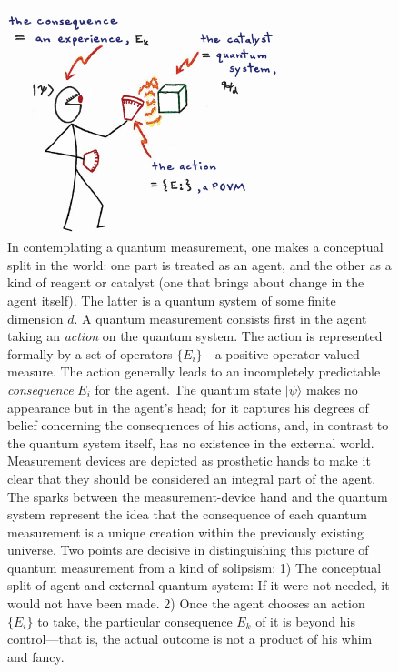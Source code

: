 \begin{figure}
\begin{center}
\includegraphics[height=2.6in]{paulianidea-n3.eps}
\bigskip\caption{\small In contemplating a quantum measurement, one makes a conceptual split in the world:  one part is treated as an agent, and the other as a kind of reagent or catalyst (one that brings about change in the agent itself).  The latter is a quantum system of some finite dimension $d$.  A quantum measurement consists first in the agent taking an {\it action\/} on the quantum system.  The action is represented formally by a set of operators $\{E_i\}$---a positive-operator-valued measure. The action generally leads to an incompletely predictable {\it consequence\/} $E_i$ for the agent.  The quantum state $|\psi\rangle$ makes no appearance but in the agent's head; for it captures his degrees of belief concerning the consequences of his actions, and, in contrast to the quantum system itself, has no existence in the external world.  Measurement devices are depicted as prosthetic hands to make it clear that they should be considered an integral part of the agent.  The sparks between the measurement-device hand and the quantum system represent the idea that the consequence of each quantum measurement is a unique creation within the previously existing universe.  Two points are decisive in distinguishing this picture of quantum measurement from a kind of solipsism:  1) The conceptual split of agent and external quantum system: If it were not needed, it would not have been made. 2) Once the agent chooses an action $\{E_i\}$ to take, the particular consequence $E_k$ of it is beyond his control---that is, the actual outcome is not a product of his whim and fancy.}
\end{center}
\end{figure}


